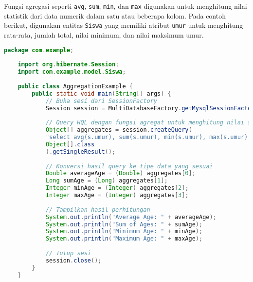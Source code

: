Fungsi agregasi seperti \texttt{avg}, \texttt{sum}, \texttt{min}, dan \texttt{max} digunakan untuk menghitung nilai statistik dari data numerik dalam satu atau beberapa kolom. Pada contoh berikut, digunakan entitas \texttt{Siswa} yang memiliki atribut \texttt{umur} untuk menghitung rata-rata, jumlah total, nilai minimum, dan nilai maksimum umur.

\begin{lstlisting}[language=Java, style=JavaStyle]
	package com.example;
	
	import org.hibernate.Session;
	import com.example.model.Siswa;
	
	public class AggregationExample {
		public static void main(String[] args) {
			// Buka sesi dari SessionFactory
			Session session = MultiDatabaseFactory.getMysqlSessionFactory().openSession();
			
			// Query HQL dengan fungsi agregat untuk menghitung nilai statistik dari kolom umur
			Object[] aggregates = session.createQuery(
			"select avg(s.umur), sum(s.umur), min(s.umur), max(s.umur) from Siswa s", 
			Object[].class
			).getSingleResult();
			
			// Konversi hasil query ke tipe data yang sesuai
			Double averageAge = (Double) aggregates[0];
			Long sumAge = (Long) aggregates[1];
			Integer minAge = (Integer) aggregates[2];
			Integer maxAge = (Integer) aggregates[3];
			
			// Tampilkan hasil perhitungan
			System.out.println("Average Age: " + averageAge);
			System.out.println("Sum of Ages: " + sumAge);
			System.out.println("Minimum Age: " + minAge);
			System.out.println("Maximum Age: " + maxAge);
			
			// Tutup sesi
			session.close();
		}
	}
\end{lstlisting}

